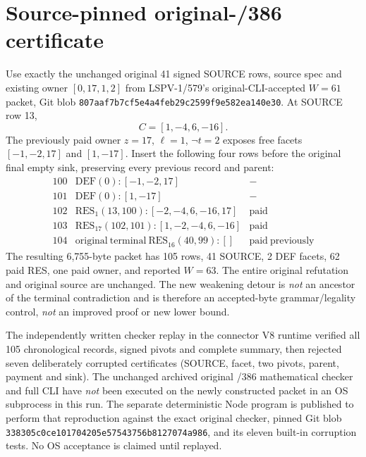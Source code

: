 \documentclass[11pt]{article}
\begin{document}
\section*{Source-pinned original-/386 certificate}
Use exactly the unchanged original 41 signed SOURCE rows, source spec and existing owner $[0,17,1,2]$ from LSPV-1/579's original-CLI-accepted $W=61$ packet, Git blob \texttt{807aaf7b7cf5e4a4feb29c2599f9e582ea140e30}. At SOURCE row 13,
\[
 C=[1,-4,6,-16].
\]
The previously paid owner $z=17$, $\ell=1$, $\neg t=2$ exposes free facets $[-1,-2,17]$ and $[1,-17]$. Insert the following four rows before the original final empty sink, preserving every previous record and parent:
\[
\begin{array}{c|l|l}
100 & \mathrm{DEF}(0):[-1,-2,17] & -\\
101 & \mathrm{DEF}(0):[1,-17] & -\\
102 & \mathrm{RES}_{1}(13,100):[-2,-4,6,-16,17] & \mathrm{paid}\\
103 & \mathrm{RES}_{17}(102,101):[1,-2,-4,6,-16] & \mathrm{paid}\\
104 & \mathrm{original\ terminal\ RES}_{16}(40,99):[] & \mathrm{paid\ previously}
\end{array}
\]
The resulting 6,755-byte packet has 105 rows, 41 SOURCE, 2 DEF facets, 62 paid RES, one paid owner, and reported $W=63$. The entire original refutation and original source are unchanged. The new weakening detour is \emph{not} an ancestor of the terminal contradiction and is therefore an accepted-byte grammar/legality control, \emph{not} an improved proof or new lower bound.

The independently written checker replay in the connector V8 runtime verified all 105 chronological records, signed pivots and complete summary, then rejected seven deliberately corrupted certificates (SOURCE, facet, two pivots, parent, payment and sink). The unchanged archived original /386 mathematical checker and full CLI have \emph{not} been executed on the newly constructed packet in an OS subprocess in this run. The separate deterministic Node program is published to perform that reproduction against the exact original checker, pinned Git blob \texttt{338305c0ce101704205e57543756b8127074a986}, and its eleven built-in corruption tests. No OS acceptance is claimed until replayed.
\end{document}
